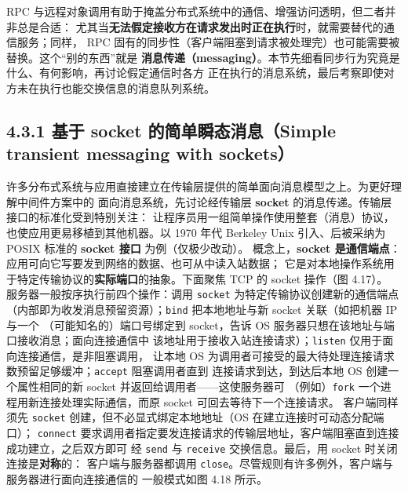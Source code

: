 

RPC 与远程对象调用有助于掩盖分布式系统中的通信、增强访问透明，但二者并非总是合适：
尤其当\textbf{无法假定接收方在请求发出时正在执行}时，就需要替代的通信服务；同样，
RPC 固有的同步性（客户端阻塞到请求被处理完）也可能需要被替换。这个“别的东西”就是
\textbf{消息传递（messaging）}。本节先细看同步行为究竟是什么、有何影响，再讨论假定通信时各方
正在执行的消息系统，最后考察即使对方未在执行也能交换信息的消息队列系统。

\subsection*{4.3.1 基于 socket 的简单瞬态消息（Simple transient messaging with sockets）}
许多分布式系统与应用直接建立在传输层提供的简单面向消息模型之上。为更好理解中间件方案中的
面向消息系统，先讨论经传输层 \textbf{socket} 的消息传递。传输层接口的标准化受到特别关注：
让程序员用一组简单操作使用整套（消息）协议，也使应用更易移植到其他机器。以 1970 年代
Berkeley Unix 引入、后被采纳为 POSIX 标准的 \textbf{socket 接口} 为例（仅极少改动）。
概念上，\textbf{socket 是通信端点}：应用可向它写要发到网络的数据、也可从中读入站数据；
它是对本地操作系统用于特定传输协议的\textbf{实际端口}的抽象。下面聚焦 TCP 的 socket 操作（图 4.17）。
服务器一般按序执行前四个操作：调用 \texttt{socket} 为特定传输协议创建新的通信端点
（内部即为收发消息预留资源）；\texttt{bind} 把本地地址与新 socket 关联（如把机器 IP 与一个
（可能知名的）端口号绑定到 socket，告诉 OS 服务器只想在该地址与端口接收消息；面向连接通信中
该地址用于接收入站连接请求）；\texttt{listen} 仅用于面向连接通信，是非阻塞调用，
让本地 OS 为调用者可接受的最大待处理连接请求数预留足够缓冲；\texttt{accept} 阻塞调用者直到
连接请求到达，到达后本地 OS 创建一个属性相同的新 socket 并返回给调用者——这使服务器可
（例如）\texttt{fork} 一个进程用新连接处理实际通信，而原 socket 可回去等待下一个连接请求。
客户端同样须先 \texttt{socket} 创建，但不必显式绑定本地地址（OS 在建立连接时可动态分配端口）；
\texttt{connect} 要求调用者指定要发连接请求的传输层地址，客户端阻塞直到连接成功建立，之后双方即可
经 \texttt{send} 与 \texttt{receive} 交换信息。最后，用 socket 时关闭连接是\textbf{对称}的：
客户端与服务器都调用 \texttt{close}。尽管规则有许多例外，客户端与服务器进行面向连接通信的
一般模式如图 4.18 所示。

\begin{closeread}
\end{closeread}

